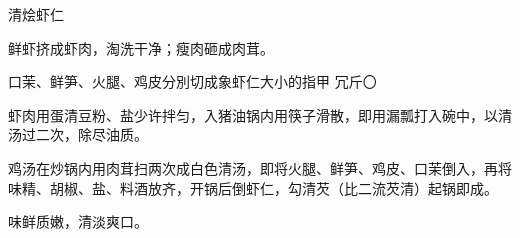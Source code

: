 \begin{recipe}{清烩虾仁}

\ingredients


\preparation

\step 鲜虾挤成虾肉，淘洗干净；瘦肉砸成肉茸。

\step 口茉、鲜笋、火腿、鸡皮分別切成象虾仁大小的指甲 冗斤〇

\step 虾肉用蛋清豆粉、盐少许拌匀，入猪油锅内用筷子滑散，即用漏瓢打入碗中，以清
汤过二次，除尽油质。

\step 鸡汤在炒锅内用肉茸扫两次成白色清汤，即将火腿、鲜笋、鸡皮、口茉倒入，再将
味精、胡椒、盐、料酒放齐，开锅后倒虾仁，勾清芡（比二流芡清）起锅即成。

\features

味鲜质嫩，清淡爽口。

\end{recipe}

